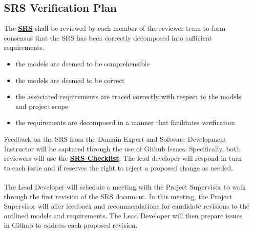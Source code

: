 \documentclass[12pt, titlepage]{article}
\begin{document}
\subsection{SRS Verification Plan}
The \textbf{\href{https://github.com/KiranSingh15/CAS-741-Image-Correspondences/blob/main/docs/SRS/SRS.pdf}
{SRS}} shall be reviewed by each member of the reviewer team to form consensus that the SRS has been correctly 
decomposed into sufficient requirements.\\
\begin{itemize}
\item the models are deemed to be comprehensible
\item the models are deemed to be correct
\item the associated requirements are traced correctly with respect to the models 
and project scope 
\item the requirements are decomposed in a manner that facilitates verification
\end{itemize}
Feedback on the SRS from the Domain Expert and Software Development Instructor will be captured through 
the use of Github Issues. Specifically, both reviewers will use the 
\textbf{\href{https://github.com/KiranSingh15/CAS-741-Image-Correspondences/blob/
main/docs/Checklists/SRS-Checklist.pdf}
{SRS Checklist}}. 
The lead developer will respond in turn to each issue and if 
reserves the right to reject a proposed change as needed. \\ \\
The Lead Developer will schedule a meeting with the Project Supervisor to walk through 
the first revision of the SRS document. In this meeting, the Project Supervisor will offer 
feedback and recommendations for candidate revisions to the outlined models and requirements. 
The Lead Developer will then prepare issues in Github to address each proposed revision. \\
\end{document}
